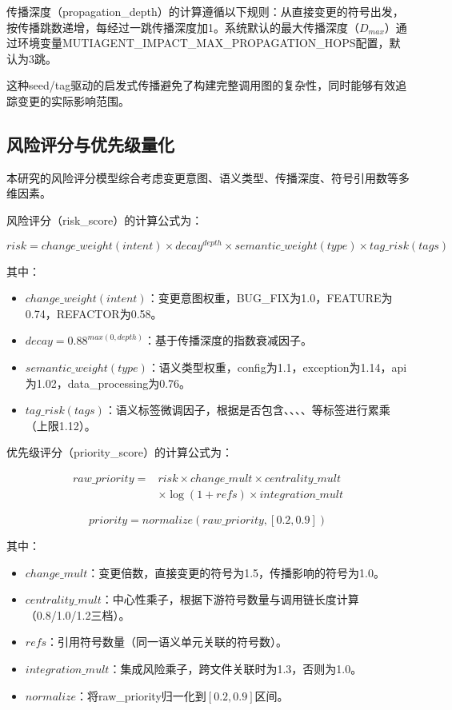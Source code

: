 传播深度（propagation\_depth）的计算遵循以下规则：从直接变更的符号出发，按传播跳数递增，每经过一跳传播深度加1。系统默认的最大传播深度（$D_{max}$）通过环境变量MUTIAGENT\_IMPACT\_MAX\_PROPAGATION\_HOPS配置，默认为3跳。

这种seed/tag驱动的启发式传播避免了构建完整调用图的复杂性，同时能够有效追踪变更的实际影响范围。

\subsection{风险评分与优先级量化}
本研究的风险评分模型综合考虑变更意图、语义类型、传播深度、符号引用数等多维因素。

风险评分（risk\_score）的计算公式为：

\[
risk = change\_weight(intent) \times decay^{depth} \times semantic\_weight(type) \times tag\_risk(tags)
\]

其中：
\begin{itemize}
    \item $change\_weight(intent)$：变更意图权重，BUG\_FIX为1.0，FEATURE为0.74，REFACTOR为0.58。
    \item $decay = 0.88^{max(0, depth)}$：基于传播深度的指数衰减因子。
    \item $semantic\_weight(type)$：语义类型权重，config为1.1，exception为1.14，api为1.02，data\_processing为0.76。
    \item $tag\_risk(tags)$：语义标签微调因子，根据是否包含、\allowbreak{}、\allowbreak{}、\allowbreak{}、\allowbreak{}等标签进行累乘（上限1.12）。
\end{itemize}

优先级评分（priority\_score）的计算公式为：

\[
\begin{aligned}
raw\_priority = {}& risk \times change\_mult \times centrality\_mult \\
& \times \log(1 + refs) \times integration\_mult
\end{aligned}
\]

\[
priority = normalize(raw\_priority, [0.2, 0.9])
\]

其中：
\begin{itemize}
    \item $change\_mult$：变更倍数，直接变更的符号为1.5，传播影响的符号为1.0。
    \item $centrality\_mult$：中心性乘子，根据下游符号数量与调用链长度计算（0.8/1.0/1.2三档）。
    \item $refs$：引用符号数量（同一语义单元关联的符号数）。
    \item $integration\_mult$：集成风险乘子，跨文件关联时为1.3，否则为1.0。
    \item $normalize$：将raw\_priority归一化到$[0.2, 0.9]$区间。
\end{itemize}

